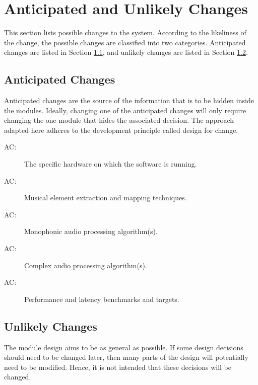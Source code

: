\documentclass[12pt, titlepage]{article}
\newcounter{acnum}
\newcommand{\actheacnum}{AC\theacnum}
\begin{document}
\section{Anticipated and Unlikely Changes} \label{SecChange}

This section lists possible changes to the system. According to the likeliness
of the change, the possible changes are classified into two
categories. Anticipated changes are listed in Section \ref{SecAchange}, and
unlikely changes are listed in Section \ref{SecUchange}.

\subsection{Anticipated Changes} \label{SecAchange}

Anticipated changes are the source of the information that is to be hidden
inside the modules. Ideally, changing one of the anticipated changes will only
require changing the one module that hides the associated decision. The approach
adapted here adheres to the development principle called design for change.

\begin{description}
  \item[ \actheacnum \label{acHardware}:] The specific hardware on which the software is running.
  \item[ \actheacnum \label{acExtractionMapping}:] Musical element extraction and mapping techniques.
  \item[ \actheacnum \label{acMonophonic}:] Monophonic audio processing algorithm(s).
  \item[ \actheacnum \label{acComplex}:] Complex audio processing algorithm(s).
  \item[ \actheacnum \label{acPerformance}:] Performance and latency benchmarks and targets.
\end{description}
  
\subsection{Unlikely Changes} \label{SecUchange}

The module design aims to be as general as possible. If some design decisions
should need to be changed later, then many parts of the design
will potentially need to be modified. Hence, it is not intended that these
decisions will be changed.
\end{document}
